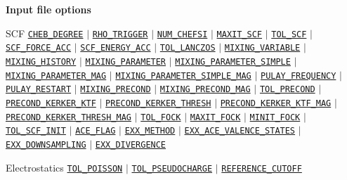 \documentclass[xcolor=dvipsnames,t]{beamer}
\begin{document}
\begin{frame}[allowframebreaks]{\textbf{Input file options}}
\begin{block}{SCF}
\hyperlink{CHEB_DEGREE}{\texttt{CHEB\_DEGREE}} $\vert$ 
\hyperlink{RHO_TRIGGER}{\texttt{RHO\_TRIGGER}} $\vert$ 
\hyperlink{NUM_CHEFSI}{\texttt{NUM\_CHEFSI}} $\vert$ 
\hyperlink{MAXIT_SCF}{\texttt{MAXIT\_SCF}} $\vert$ 
\hyperlink{TOL_SCF}{\texttt{TOL\_SCF}} $\vert$ 
\hyperlink{SCF_FORCE_ACC}{\texttt{SCF\_FORCE\_ACC}} $\vert$ 
\hyperlink{SCF_ENERGY_ACC}{\texttt{SCF\_ENERGY\_ACC}} $\vert$ 
\hyperlink{TOL_LANCZOS}{\texttt{TOL\_LANCZOS}} $\vert$ 
\hyperlink{MIXING_VARIABLE}{\texttt{MIXING\_VARIABLE}} $\vert$ 
\hyperlink{MIXING_HISTORY}{\texttt{MIXING\_HISTORY}} $\vert$ 
\hyperlink{MIXING_PARAMETER}{\texttt{MIXING\_PARAMETER}} $\vert$ 
\hyperlink{MIXING_PARAMETER_SIMPLE}{\texttt{MIXING\_PARAMETER\_SIMPLE}} $\vert$ 
\hyperlink{MIXING_PARAMETER_MAG}{\texttt{MIXING\_PARAMETER\_MAG}} $\vert$
\hyperlink{MIXING_PARAMETER_SIMPLE_MAG}{\texttt{MIXING\_PARAMETER\_SIMPLE\_MAG}} $\vert$
\hyperlink{PULAY_FREQUENCY}{\texttt{PULAY\_FREQUENCY}} $\vert$ 
\hyperlink{PULAY_RESTART}{\texttt{PULAY\_RESTART}} $\vert$ 
\hyperlink{MIXING_PRECOND}{\texttt{MIXING\_PRECOND}} $\vert$ 
\hyperlink{MIXING_PRECOND_MAG}{\texttt{MIXING\_PRECOND\_MAG}} $\vert$ 
\hyperlink{TOL_PRECOND}{\texttt{TOL\_PRECOND}} $\vert$ 
\hyperlink{PRECOND_KERKER_KTF}{\texttt{PRECOND\_KERKER\_KTF}} $\vert$ 
\hyperlink{PRECOND_KERKER_THRESH}{\texttt{PRECOND\_KERKER\_THRESH}} $\vert$ 
\hyperlink{PRECOND_KERKER_KTF_MAG}{\texttt{PRECOND\_KERKER\_KTF\_MAG}} $\vert$ 
\hyperlink{PRECOND_KERKER_THRESH\_MAG}{\texttt{PRECOND\_KERKER\_THRESH\_MAG}} $\vert$ 
\hyperlink{TOL_FOCK}{\texttt{TOL\_FOCK}} $\vert$ 
\hyperlink{MAXIT_FOCK}{\texttt{MAXIT\_FOCK}} $\vert$ 
\hyperlink{MINIT_FOCK}{\texttt{MINIT\_FOCK}} $\vert$ 
\hyperlink{TOL_SCF_INIT}{\texttt{TOL\_SCF\_INIT}} $\vert$ 
\hyperlink{ACE_FLAG}{\texttt{ACE\_FLAG}} $\vert$ 
\hyperlink{EXX_METHOD}{\texttt{EXX\_METHOD}} $\vert$ 
\hyperlink{EXX_ACE_VALENCE_STATES}{\texttt{EXX\_ACE\_VALENCE\_STATES}} $\vert$ 
\hyperlink{EXX_DOWNSAMPLING}{\texttt{EXX\_DOWNSAMPLING}} $\vert$ 
\hyperlink{EXX_DIVERGENCE}{\texttt{EXX\_DIVERGENCE}}
\end{block}

\vspace{-2mm}
\begin{block}{Electrostatics}
\hyperlink{TOL_POISSON}{\texttt{TOL\_POISSON}} $\vert$ \hyperlink{TOL_PSEUDOCHARGE}{\texttt{TOL\_PSEUDOCHARGE}} $\vert$ \hyperlink{REFERENCE_CUTOFF}{\texttt{REFERENCE\_CUTOFF}}
\end{block}


\end{frame}
\end{document}
